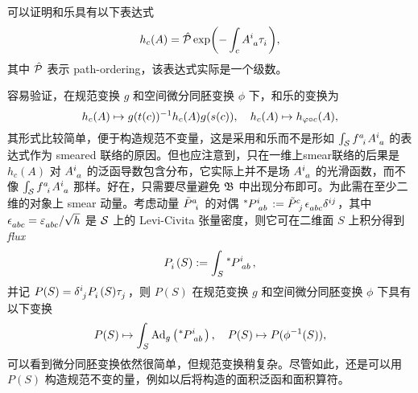 		可以证明和乐具有以下表达式
		\begin{equation}
			h_c(A) = \pathorder \exp(-\int_c \tensor{A}{^i_a} \tensor{\tau}{_i}),\label{eq-holonomy}
		\end{equation}
		其中 $\hat{\mathcal{P}}$ 表示 path-ordering，该表达式实际是一个级数\cite{Baez1994,Nakahara2003}。


		容易验证，在规范变换 $g$ 和空间微分同胚变换 $\phi$ 下，和乐的变换为
		\begin{equation}
			h_c(A) \mapsto g(t(c))^{-1} h_c(A) g(s(c)) \qc h_c(A) \mapsto h_{\varphi\circ c}(A),
		\end{equation}
		其形式比较简单，便于构造规范不变量，这是采用和乐而不是形如 $\int_{\spc} \tensor{f}{^a_i} \tensor{A}{^i_a}$ 的表达式作为 smeared 联络的原因。但也应注意到，只在一维上smear联络的后果是 $h_c(A)$ 对 $\tensor{A}{^i_a}$ 的泛函导数包含分布，它实际上并不是场 $\tensor{A}{^i_a}$ 的光滑函数，而不像 $\int_{\spc} \tensor{f}{^a_i} \tensor{A}{^i_a}$ 那样。好在，只需要尽量避免 $\mathfrak{B}$ 中出现分布即可。为此需在至少二维的对象上 smear 动量。考虑动量 $\tensor{\tilde{P}}{^a_i}$ 的对偶 $\tensor[^*]{P}{^i_a_b} \definedby \tensor{\tilde{P}}{^c_j} \tensor{\nvol}{_a_b_c} \tensor{\delta}{^i^j}$，其中 $\tensor{\nvol}{_a_b_c} = \tensor{\vol}{_a_b_c}/\sqrt{h}$ 是 $\mathcal{S}$ 上的 Levi-Civita 张量密度，则它可在二维面 $S$ 上积分得到 \emph{flux}
		\begin{equation}
			\tensor{P}{_i}(S) \definedby \int_S \tensor[^*]{P}{^i_a_b},
		\end{equation}
		并记 $P(S) = \tensor{\delta}{^i_j} \tensor{P}{_i}(S) \tensor{\tau}{_j}$，则 $P(S)$ 在规范变换 $g$ 和空间微分同胚变换 $\phi$ 下具有以下变换
		\begin{equation}
			P(S) \mapsto \int_S \Ad{g}\left( \tensor[^*]{P}{^i_a_b} \right) \qc P(S) \mapsto P(\phi^{-1}(S)),
		\end{equation}
		可以看到微分同胚变换依然很简单，但规范变换稍复杂。尽管如此，还是可以用 $P(S)$ 构造规范不变的量，例如以后将构造的面积泛函和面积算符。

